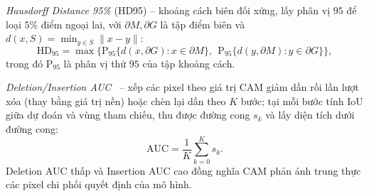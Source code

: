 \emph{Hausdorff Distance 95\%} (HD95) -- khoảng cách biên đối xứng, lấy phân vị $95$ để loại $5\%$ điểm ngoại lai, với $\partial M, \partial G$ là tập điểm biên và $d(x, S)=\min_{y\in S}\lVert x-y\rVert$:
\begin{equation}
    \text{HD}_{95} = \max\!\Big\{ \mathrm{P}_{95}\big\{ d(x,\partial G) : x\in\partial M \big\},\ \ \mathrm{P}_{95}\big\{ d(y,\partial M) : y\in\partial G \big\} \Big\},
\end{equation}
trong đó $\mathrm{P}_{95}$ là phân vị thứ $95$ của tập khoảng cách.

\emph{Deletion/Insertion AUC}~\cite{petsiuk2018rise} -- xếp các pixel theo giá trị CAM giảm dần rồi lần lượt xóa (thay bằng giá trị nền) hoặc chèn lại dần theo $K$ bước; tại mỗi bước tính IoU giữa dự đoán và vùng tham chiếu, thu được đường cong $s_k$ và lấy diện tích dưới đường cong:
\begin{equation}
    \text{AUC} = \frac{1}{K}\sum_{k=0}^{K} s_k .
\end{equation}
Deletion AUC thấp và Insertion AUC cao đồng nghĩa CAM phản ánh trung thực các pixel chi phối quyết định của mô hình.
